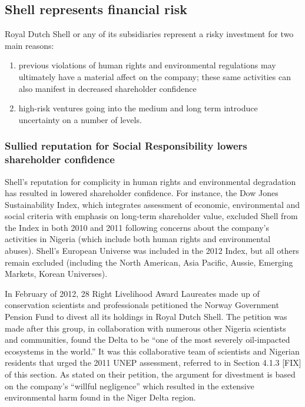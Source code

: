 


	\subsection{Shell represents financial risk}
	


Royal Dutch Shell or any of its subsidiaries represent a risky investment for two main reasons:
\begin{enumerate}
	\item previous violations of human rights and environmental regulations may ultimately have a material affect on the company; these same activities can also manifest in decreased shareholder confidence
	\item high-risk ventures going into the medium and long term introduce uncertainty on a number of levels.
\end{enumerate}

	
	
	\subsubsection{Sullied reputation for Social Responsibility lowers shareholder confidence}
	
	
	
Shell's reputation for complicity in human rights and environmental degradation has resulted in lowered shareholder confidence. 
For instance, the Dow Jones Sustainability Index, which integrates assessment of economic, environmental and social criteria with emphasis on long-term shareholder value, excluded Shell from the Index in both 2010 and 2011 following concerns about the company's activities in Nigeria (which include both human rights and environmental abuses). 
Shell's European Universe was included in the 2012 Index, but all others remain excluded (including the North American, Asia Pacific, Aussie, Emerging Markets, Korean Universes).



In February of 2012, 28 Right Livelihood Award Laureates made up of conservation scientists and professionals petitioned the Norway Government Pension Fund to divest all its holdings in Royal Dutch Shell. 
The petition was made after this group, in collaboration with numerous other Nigeria scientists and communities, found the Delta to be ``one of the most severely oil-impacted ecosystems in the world.''  
It was this collaborative team of scientists and Nigerian residents that urged the 2011 UNEP assessment, referred to in Section 4.1.3 [FIX] of this section. 
As stated on their petition, the argument for divestment is based on the company's ``willful negligence'' which resulted in the extensive environmental harm found in the Niger Delta region.



